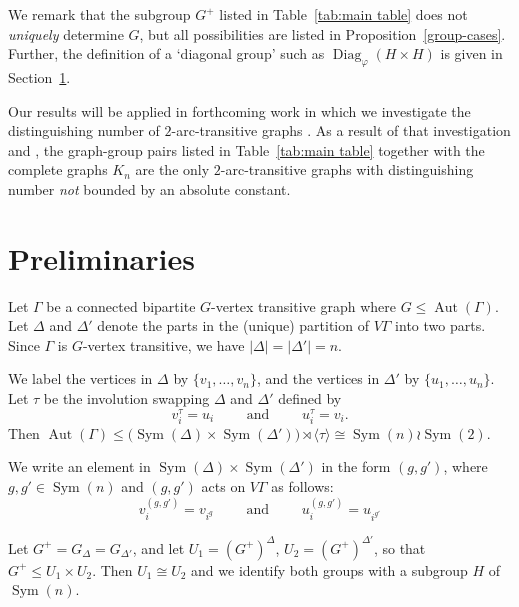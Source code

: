 \documentclass[11pt]{amsart}
\DeclareMathOperator{\Sym}{Sym}
\DeclareMathOperator{\Aut}{Aut}
\DeclareMathOperator{\Diag}{Diag}
\begin{document}
We remark that the subgroup $G^+$ listed in Table~\ref{tab:main table} does not \emph{uniquely} determine $G$, but all possibilities are listed in Proposition~\ref{group-cases}. Further, the definition of a `diagonal group' such as $\Diag_\varphi(H\times H)$ is given in Section~\ref{sec:prelims}.
 
Our results will be applied in forthcoming work in which we investigate the distinguishing number of $2$-arc-transitive graphs \cite{CDMR}. As a result of that investigation and \cite[Corollary 5]{DMH2018}, the graph-group pairs listed in Table~\ref{tab:main table} together with the complete graphs $K_n$ are the only $2$-arc-transitive   graphs with distinguishing number \emph{not} bounded by an absolute constant. 


\section{Preliminaries}
\label{sec:prelims}


Let $\Gamma$ be a connected bipartite $G$-vertex transitive graph where $G\leqslant \Aut(\Gamma)$.
Let $\Delta$ and $\Delta'$ denote the parts in the (unique) partition of $V\Gamma$ into two parts.
Since $\Gamma$ is $G$-vertex transitive, we have $|\Delta|=|\Delta'|=n$.

We label the vertices in \(\Delta\) by \(\{v_1,\ldots,v_n\}\),
and  the vertices in \(\Delta'\) by \(\{u_1,\ldots,u_n\}\).
Let $\tau$ be the  involution swapping $\Delta$ and $\Delta'$ defined by
$$
v_i^\tau=u_i
\qquad \text{ and } \qquad
u_i^\tau=v_i.
$$
Then
$
\Aut(\Gamma)
\leqslant
\bigl(\Sym(\Delta)\times \Sym(\Delta')\bigr) \rtimes \langle \tau \rangle
\cong
\Sym(n) \wr \Sym(2).
$

We write an element in $\Sym(\Delta)\times \Sym(\Delta')$ in the form $(g,g')$, where $g,g'\in \Sym(n)$ and  $(g,g')$ acts on $V\Gamma$ as follows:
$$
v_i^{(g,g')}=v_{i^g}
\qquad \text{ and } \qquad
u_i^{(g,g')}=u_{i^{g'}}
$$


Let $G^+=G_\Delta=G_{\Delta'}$, and let  $U_1=(G^+)^\Delta$, $U_2=(G^+)^{\Delta'}$, so that $G^+\leqslant U_1\times U_2$.  Then $ U_1\cong U_2$ and we identify both groups with a subgroup $H$ of $\Sym(n)$. 
\end{document}
